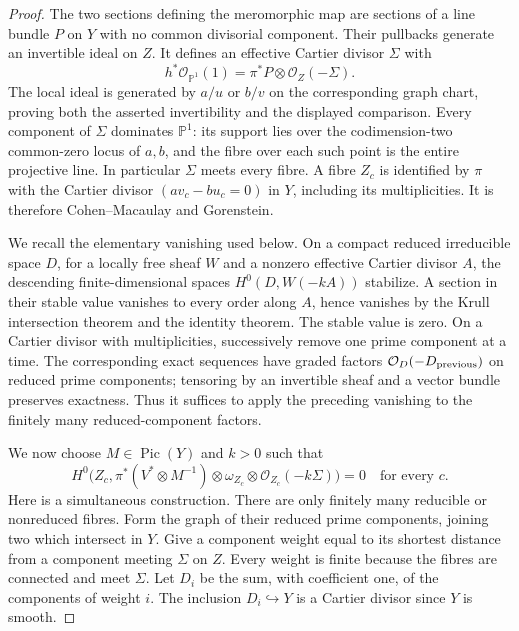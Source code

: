 \begin{proof}
The two sections defining the meromorphic map are sections of a line
bundle $P$ on $Y$ with no common divisorial component. Their pullbacks
generate an invertible ideal on $Z$. It defines an effective Cartier
divisor $\Sigma$ with
\begin{equation}\label{eq:E-graph-pencil}
 h^*\mathcal O_{\mathbb P^1}(1)=\pi^*P\otimes\mathcal O_Z(-\Sigma).
\end{equation}
The local ideal is generated by $a/u$ or $b/v$ on the corresponding
graph chart, proving both the asserted invertibility and the displayed
comparison. Every component of $\Sigma$ dominates $\mathbb P^1$:
its support lies over the codimension-two common-zero locus of $a,b$,
and the fibre over each such point is the entire projective line.
In particular $\Sigma$ meets every fibre. A fibre $Z_c$ is identified
by $\pi$ with the Cartier divisor $(a v_c-bu_c=0)$ in $Y$, including
its multiplicities. It is therefore Cohen--Macaulay and Gorenstein.

We recall the elementary vanishing used below. On a compact reduced
irreducible space $D$, for a locally free sheaf $W$ and a nonzero
effective Cartier divisor $A$, the descending finite-dimensional
spaces $H^0(D,W(-kA))$ stabilize. A section in their stable value
vanishes to every order along $A$, hence vanishes by the Krull
intersection theorem and the identity theorem. The stable value is
zero. On a Cartier divisor with multiplicities, successively remove
one prime component at a time. The corresponding exact sequences
have graded factors $\mathcal O_D(-D_{\rm previous})$ on reduced prime
components; tensoring by an invertible sheaf and a vector bundle
preserves exactness. Thus it suffices to apply the preceding vanishing
to the finitely many reduced-component factors.

We now choose $M\in\operatorname{Pic}(Y)$ and $k>0$ such that
\begin{equation}\label{eq:E-all-fibres}
 H^0\bigl(Z_c,\pi^*(V^*\otimes M^{-1})\otimes
       \omega_{Z_c}\otimes\mathcal O_{Z_c}(-k\Sigma)\bigr)=0
 \quad\text{for every }c.
\end{equation}
Here is a simultaneous construction. There are only finitely many
reducible or nonreduced fibres. Form the graph of their reduced prime
components, joining two which intersect in $Y$. Give a component
weight equal to its shortest distance from a component meeting
$\Sigma$ on $Z$. Every weight is finite because the fibres are
connected and meet $\Sigma$. Let $D_i$ be the sum, with coefficient
one, of the components of weight $i$. The inclusion $D_i\hookrightarrow
Y$ is a Cartier divisor since $Y$ is smooth.


\end{proof}
